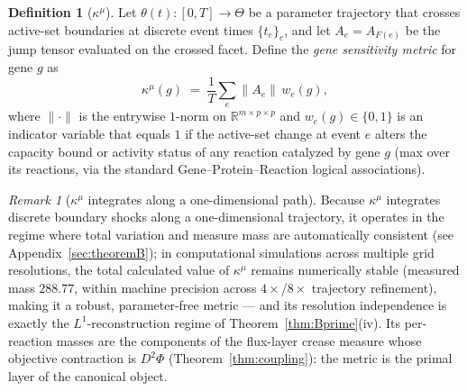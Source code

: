 \documentclass[11pt,a4paper]{article}
\theoremstyle{plain}
\theoremstyle{definition}
\newtheorem{definition}[theorem]{Definition}
\theoremstyle{remark}
\newtheorem{remark}[theorem]{Remark}
\newcommand{\kmu}{\kappa^{\mu}}
\newcommand{\RR}{\mathbb{R}}
\begin{document}
\begin{definition}[$\kmu$]\label{def:kmu}
Let $\theta(t) : [0, T] \to \Theta$ be a parameter trajectory that
crosses active-set boundaries at discrete event times $\{t_e\}_e$,
and let $A_e = A_{F(e)}$ be the jump tensor evaluated on the crossed
facet. Define the \emph{gene sensitivity metric} for gene $g$ as
\[
\kmu(g) \;=\; \frac{1}{T}\sum_{e} \bigl\| A_e \bigr\| \, w_e(g),
\]
where $\|{\cdot}\|$ is the entrywise $1$-norm on
$\RR^{m \times p \times p}$ and $w_e(g) \in \{0,1\}$ is an
indicator variable that equals $1$ if the active-set change at event
$e$ alters the capacity bound or activity status of any reaction
catalyzed by gene $g$ (max over its reactions, via the standard
Gene--Protein--Reaction logical associations).
\end{definition}

\begin{remark}[$\kmu$ integrates along a one-dimensional path]
Because $\kmu$ integrates discrete boundary shocks along a
one-dimensional trajectory, it operates in the regime where total
variation and measure mass are automatically consistent (see
Appendix~\ref{sec:theoremB}); in computational simulations across
multiple
grid resolutions, the total calculated value of $\kmu$ remains
numerically stable (measured mass $288.77$, within machine precision
across $4\times$/$8\times$ trajectory refinement), making it a
robust, parameter-free metric --- and its resolution independence is
exactly the $L^1$-reconstruction regime of
Theorem~\ref{thm:Bprime}(iv). Its per-reaction masses are the components of the
flux-layer crease measure whose objective contraction is $D^2\Phi$
(Theorem~\ref{thm:coupling}): the metric is the primal layer of the
canonical object.
\end{remark}
\end{document}
